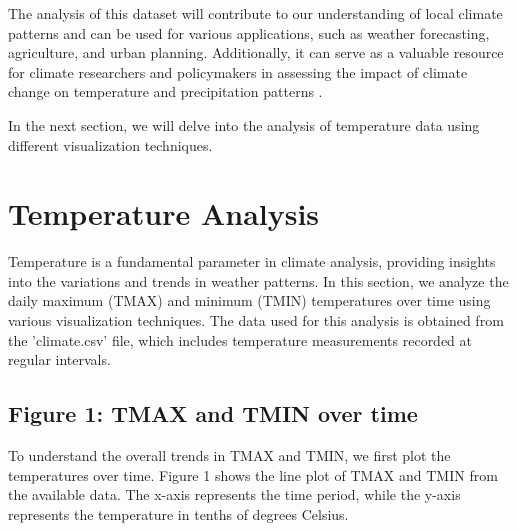 \documentclass{article}
\begin{document}
The analysis of this dataset will contribute to our understanding of local climate patterns and can be used for various applications, such as weather forecasting, agriculture, and urban planning. Additionally, it can serve as a valuable resource for climate researchers and policymakers in assessing the impact of climate change on temperature and precipitation patterns \cite{smith2020climate}.

In the next section, we will delve into the analysis of temperature data using different visualization techniques.
\section{Temperature Analysis}

Temperature is a fundamental parameter in climate analysis, providing insights into the variations and trends in weather patterns. In this section, we analyze the daily maximum (TMAX) and minimum (TMIN) temperatures over time using various visualization techniques. The data used for this analysis is obtained from the 'climate.csv' file, which includes temperature measurements recorded at regular intervals.

\subsection{Figure 1: TMAX and TMIN over time}

To understand the overall trends in TMAX and TMIN, we first plot the temperatures over time. Figure 1 shows the line plot of TMAX and TMIN from the available data. The x-axis represents the time period, while the y-axis represents the temperature in tenths of degrees Celsius.
\end{document}
